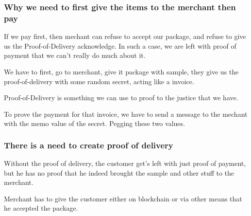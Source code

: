 \documentclass{article}
\begin{document}
\subsubsection{Why we need to first give the items to the merchant then pay}

If we pay first, then mechant can refuse to accept our package, and refuse to give us the Proof-of-Delivery acknowledge. In such a case, we are left with proof of payment that we can't really do much about it.

We have to first, go to merchant, give it package with sample, they give us the proof-of-delivery with some random secret, acting like a invoice.

Proof-of-Delivery is something we can use to proof to the justice that we have.

To prove the payment for that invoice, we have to send a message to the mechant with the memo value of the secret. Pegging these two values.

\subsubsection{There is a need to create proof of delivery}

Without the proof of delivery, the customer get's left with just proof of payment, but he has no proof that he indeed brought the sample and other stuff to the merchant.

Merchant has to give the customer either on blockchain or via other means that he accepted the package.
\end{document}
